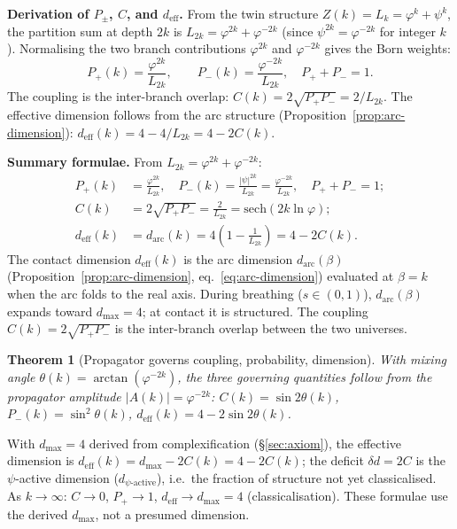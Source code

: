 \documentclass[12pt,a4paper]{article}
\newtheorem{theorem}{Theorem}[section]
\begin{document}
\noindent\textbf{Derivation of $P_\pm$, $C$, and $d_{\mathrm{eff}}$.} From the twin structure $Z(k) = L_k = \varphi^k + \psi^k$, the partition sum at depth $2k$ is $L_{2k} = \varphi^{2k} + \varphi^{-2k}$ (since $\psi^{2k} = \varphi^{-2k}$ for integer $k$). Normalising the two branch contributions $\varphi^{2k}$ and $\varphi^{-2k}$ gives the Born weights:
\begin{equation}
P_+(k) = \frac{\varphi^{2k}}{L_{2k}}, \qquad P_-(k) = \frac{\varphi^{-2k}}{L_{2k}}, \quad P_+ + P_- = 1.
\end{equation}
The coupling is the inter-branch overlap: $C(k) = 2\sqrt{P_+P_-} = 2/L_{2k}$. The effective dimension follows from the arc structure (Proposition~\ref{prop:arc-dimension}): $d_{\mathrm{eff}}(k) = 4 - 4/L_{2k} = 4 - 2C(k)$.

\medskip
\noindent\textbf{Summary formulae.} From $L_{2k} = \varphi^{2k} + \varphi^{-2k}$:
\begin{align}
P_+(k) &= \frac{\varphi^{2k}}{L_{2k}}, \quad P_-(k) = \frac{|\psi|^{2k}}{L_{2k}} = \frac{\varphi^{-2k}}{L_{2k}}, \quad P_+ + P_- = 1; \\
C(k) &= 2\sqrt{P_+P_-} = \frac{2}{L_{2k}} = \mathrm{sech}(2k\ln\varphi); \label{eq:trunk-Ck} \\
d_{\mathrm{eff}}(k) &= d_{\mathrm{arc}}(k) = 4\left(1 - \frac{1}{L_{2k}}\right) = 4 - 2C(k).
\label{eq:deff-trunk}
\end{align}
The contact dimension $d_{\mathrm{eff}}(k)$ is the arc dimension $d_{\mathrm{arc}}(\beta)$ (Proposition~\ref{prop:arc-dimension}, eq.~\ref{eq:arc-dimension}) evaluated at $\beta = k$ when the arc folds to the real axis. During breathing ($s \in (0,1)$), $d_{\mathrm{arc}}(\beta)$ expands toward $d_{\max} = 4$; at contact it is structured. The coupling $C(k) = 2\sqrt{P_+P_-}$ is the inter-branch overlap between the two universes.
\begin{theorem}[Propagator governs coupling, probability, dimension]
\label{thm:propagator}
With mixing angle $\theta(k) = \arctan(\varphi^{-2k})$, the three governing quantities follow from the propagator amplitude $|A(k)| = \varphi^{-2k}$: $C(k) = \sin 2\theta(k)$, $P_-(k) = \sin^2\theta(k)$, $d_{\mathrm{eff}}(k) = 4 - 2\sin 2\theta(k)$.
\end{theorem} With $d_{\max} = 4$ derived from complexification (\S\ref{sec:axiom}), the effective dimension is $d_{\mathrm{eff}}(k) = d_{\max} - 2C(k) = 4 - 2C(k)$; the deficit $\delta d = 2C$ is the $\psi$-active dimension ($d_{\psi\text{-active}}$), i.e.\ the fraction of structure not yet classicalised. As $k \to \infty$: $C \to 0$, $P_+ \to 1$, $d_{\mathrm{eff}} \to d_{\max} = 4$ (classicalisation). These formulae use the derived $d_{\max}$, not a presumed dimension.
\end{document}
